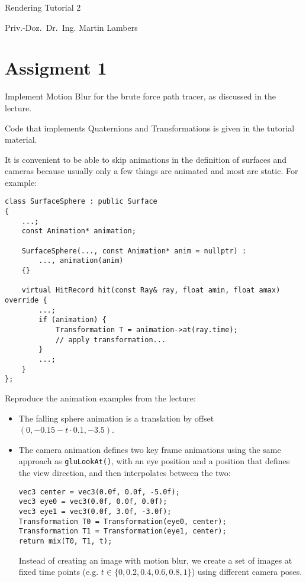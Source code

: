 \documentclass[a4paper,11pt]{article}
\newcommand{\authortitle}{Priv.-Doz.~Dr.~Ing.}
\newcommand{\authorname}{Martin Lambers}
\newcommand{\course}{Rendering}
\newcommand{\tutorial}{Tutorial 2}
\newcommand{\code}[1]{\texttt{#1}}
\begin{document}
\thispagestyle{empty}

\LARGE

\centerline{\course{} \tutorial}

\vspace{1ex}

\normalsize

\centerline{\authortitle{} \authorname}


\section*{Assigment 1}

Implement Motion Blur for the brute force path tracer, as discussed in the
lecture.

Code that implements Quaternions and Transformations is given in the tutorial
material.

It is convenient to be able to skip animations in the definition of surfaces and
cameras because usually only a few things are animated and most are static. For
example: 
\begin{lstlisting}
class SurfaceSphere : public Surface
{
    ...;
    const Animation* animation;

    SurfaceSphere(..., const Animation* anim = nullptr) :
        ..., animation(anim)
    {}

    virtual HitRecord hit(const Ray& ray, float amin, float amax) override {
        ...;
        if (animation) {
            Transformation T = animation->at(ray.time);
            // apply transformation...
        }
        ...;
    }
};
\end{lstlisting}

Reproduce the animation examples from the lecture:
\begin{itemize}
\item The falling sphere
animation is a translation by offset $(0,-0.15 - t \cdot 0.1, -3.5)$.
\item The camera
animation defines two key frame animations using the same approach as
\code{gluLookAt()}, with an eye position and a position that defines the view
direction, and then interpolates between the two:
\begin{lstlisting}
vec3 center = vec3(0.0f, 0.0f, -5.0f);
vec3 eye0 = vec3(0.0f, 0.0f, 0.0f);
vec3 eye1 = vec3(0.0f, 3.0f, -3.0f);
Transformation T0 = Transformation(eye0, center);
Transformation T1 = Transformation(eye1, center);
return mix(T0, T1, t);
\end{lstlisting}
Instead of creating an image with motion blur, we create a set of images at fixed time
points (e.g. $t \in \{ 0, 0.2, 0.4, 0.6, 0.8, 1 \}$) using different camera
poses. 
\end{itemize}
\end{document}
